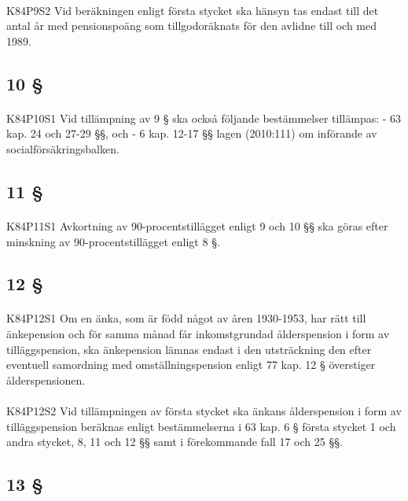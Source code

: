 \documentclass[a4paper,notitlepage,openany,10pt]{book}
\begin{document}
\paragraph*{}
{\tiny K84P9S2}
Vid beräkningen enligt första stycket ska hänsyn tas endast till det antal år med pensionspoäng som tillgodoräknats för den avlidne till och med 1989.
\subsection*{10 §}
\paragraph*{}
{\tiny K84P10S1}
Vid tillämpning av 9 § ska också följande bestämmelser tillämpas:
\newline - 63 kap. 24 och 27-29 §§, och
\newline - 6 kap. 12-17 §§ lagen (2010:111) om införande av socialförsäkringsbalken.
\subsection*{11 §}
\paragraph*{}
{\tiny K84P11S1}
Avkortning av 90-procentstillägget enligt 9 och 10 §§ ska göras efter minskning av 90-procentstillägget enligt 8 §.
\subsection*{12 §}
\paragraph*{}
{\tiny K84P12S1}
Om en änka, som är född något av åren 1930-1953, har rätt till änkepension och för samma månad får inkomstgrundad ålderspension i form av tilläggspension, ska änkepension lämnas endast i den utsträckning den efter eventuell samordning med omställningspension enligt 77 kap. 12 § överstiger ålderspensionen.
\paragraph*{}
{\tiny K84P12S2}
Vid tillämpningen av första stycket ska änkans ålderspension i form av tilläggspension beräknas enligt bestämmelserna i 63 kap. 6 § första stycket 1 och andra stycket, 8, 11 och 12 §§ samt i förekommande fall 17 och 25 §§.
\subsection*{13 §}
\end{document}
